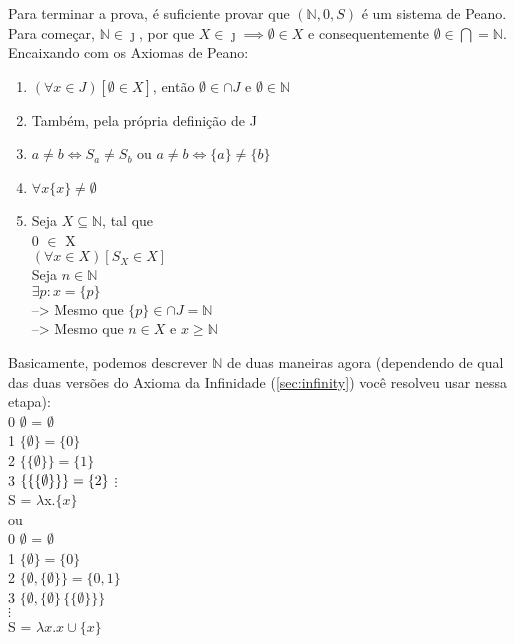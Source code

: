 \documentclass[12pt, a4paper]{article}
\begin{document}
Para terminar a prova, é suficiente provar que $(\mathbb{N}, 0, S)$ é um sistema de Peano. Para começar, $\mathbb{N} \in \jmath$, por que $X \in \jmath \implies \emptyset \in X$ e consequentemente $\emptyset \in \bigcap = \mathbb{N}$.
Encaixando com os Axiomas de Peano:
\begin{enumerate}
\item $(\forall x \in J)[\emptyset \in X]$, então $\emptyset \in \cap J$ e $\emptyset \in \mathbb{N}$
\item Também, pela própria definição de J
\item $a \neq b \iff S_a \neq S_b$ ou $a \neq b \iff \{a\} \neq \{b\}$
\item $\forall x \{x\} \neq \emptyset$
\item Seja $X \subseteq \mathbb{N}$, tal que\\
0 $\in$ X\\
$(\forall x \in X)[S_X \in X]$\\
Seja $n \in \mathbb{N}$\\
$\exists p : x = \{p\}$\\
--> Mesmo que $\{p\} \in \cap J = \mathbb{N}$\\
--> Mesmo que $n \in X$ e $x \geq \mathbb{N}$
\end{enumerate}

Basicamente, podemos descrever $\mathbb{N}$ de duas maneiras agora (dependendo de qual das duas versões do Axioma da Infinidade (\ref{sec:infinity}) você resolveu usar nessa etapa):\\	
0 \hspace{4bp} $\emptyset$ = $\emptyset$\\
1 \hspace{4bp} $\{\emptyset\} = \{0\}$\\
2 \hspace{4bp} $\{\{\emptyset\}\} = \{1\}$\\
3 \hspace{4bp} $\{\{\{\emptyset\}\}\} = \{2\}\\$
$\vdots$\\
\hspace{5bp} S = $\lambda$x.$\{x\}$ \\
ou\\
0 \hspace{4bp} $\emptyset$ = $\emptyset$\\
1 \hspace{4bp} $\{\emptyset\} = \{0\}$\\
2 \hspace{4bp} $\{\emptyset, \{\emptyset\}\} = \{0,1\}$\\
3 \hspace{4bp} $\{\emptyset, \{\emptyset\}\, \{\{\emptyset\}\}\}$\\
$\vdots$\\
\hspace{5bp} S = $\lambda x.x \cup \{x\} $
\end{document}
